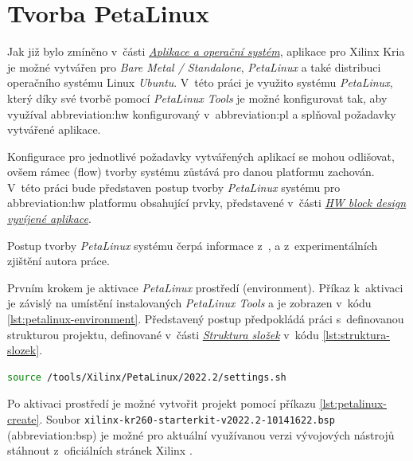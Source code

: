 \documentclass[a4paper, twoside, 11pt]{article}
\begin{document}
	\section{Tvorba PetaLinux}\label{subsec:tvorba-petalinux}
	Jak již bylo zmíněno v~části \hyperref[subsec:aplikace-a-operacni-system]{\textit{Aplikace a operační systém}}, aplikace pro Xilinx Kria je možné vytvářen pro \textit{Bare Metal / Standalone}, \textit{PetaLinux} a také distribuci operačního systému Linux \textit{Ubuntu}. V~této práci je využito systému \textit{PetaLinux}, který díky své tvorbě pomocí \textit{PetaLinux Tools} je možné konfigurovat tak, aby využíval \gls{abbreviation:hw} konfigurovaný v~\gls{abbreviation:pl} a splňoval požadavky vytvářené aplikace.\par
	Konfigurace pro jednotlivé požadavky vytvářených aplikací se mohou odlišovat, ovšem rámec (flow) tvorby systému zůstává pro danou platformu zachován. V~této práci bude představen postup tvorby \textit{PetaLinux} systému pro \gls{abbreviation:hw} platformu obsahující prvky, představené v~části \hyperref[subsubsec:hw-block-design-vyvijene-aplikace]{\textit{HW block design vyvíjené aplikace}}.\par
	Postup tvorby \textit{PetaLinux} systému čerpá informace z~\cite{hackster-getting-started-with-the-kria-kr260-in-petalinux}, \cite{xilinx-github-vitis-tutorials-step-2-create-the-software-components} a z~experimentálních zjištění autora práce.\par
	Prvním krokem je aktivace \textit{PetaLinux} prostředí (environment). Příkaz k~aktivaci je závislý na umístění instalovaných \textit{PetaLinux Tools} a je zobrazen v~kódu \ref{lst:petalinux-environment}. Představený postup předpokládá práci s~definovanou strukturou projektu, definované v~části \hyperref[sec:struktura-slozek]{\textit{Struktura složek}} v~kódu \ref{lst:struktura-slozek}.


	\begin{lstlisting}[language={sh}, caption={Aktivace prostředí PetaLinux verze 2022.2.}, label= {lst:petalinux-environment}, morekeywords={source}]
source /tools/Xilinx/PetaLinux/2022.2/settings.sh\end{lstlisting}

	Po aktivaci prostředí je možné vytvořit projekt pomocí příkazu \ref{lst:petalinux-create}. Soubor \texttt{xilinx-kr260-starterkit-v2022.2-10141622.bsp} (\gls{abbreviation:bsp}) je možné pro aktuální využívanou verzi vývojových nástrojů stáhnout z~oficiálních stránek Xilinx \cite{xilinx-downloads}.
\end{document}
